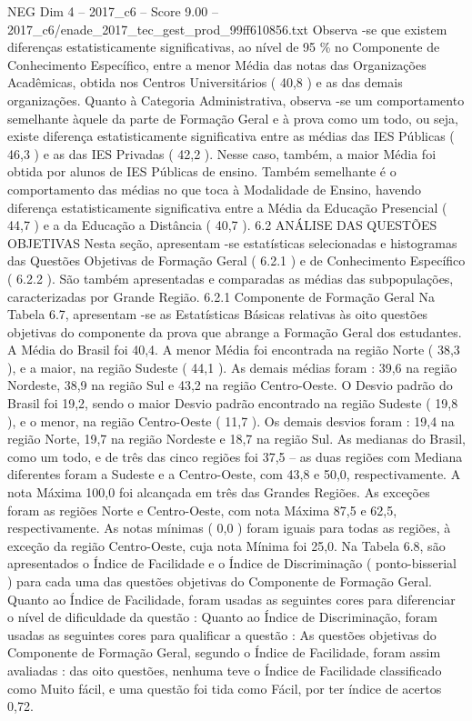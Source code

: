 \begin{textsample}{NEG Dim 4 – 2017\_c6 – Score 9.00 – 2017\_c6/enade\_2017\_tec\_gest\_prod\_99ff610856.txt}
Observa -se que existem diferenças estatisticamente significativas, ao nível de 95 \% no Componente de Conhecimento Específico, entre a menor Média das notas das Organizações Acadêmicas, obtida nos Centros Universitários ( 40,8 ) e as das demais organizações.
Quanto à Categoria Administrativa, observa -se um comportamento semelhante àquele da parte de Formação Geral e à prova como um todo, ou seja, existe diferença estatisticamente significativa entre as médias das IES Públicas ( 46,3 ) e as das IES Privadas ( 42,2 ).
Nesse caso, também, a maior Média foi obtida por alunos de IES Públicas de ensino.
Também semelhante é o comportamento das médias no que toca à Modalidade de Ensino, havendo diferença estatisticamente significativa entre a Média da Educação Presencial ( 44,7 ) e a da Educação a Distância ( 40,7 ). 6.2 ANÁLISE DAS QUESTÕES OBJETIVAS Nesta seção, apresentam -se estatísticas selecionadas e histogramas das Questões Objetivas de Formação Geral ( 6.2.1 ) e de Conhecimento Específico ( 6.2.2 ).
São também apresentadas e comparadas as médias das subpopulações, caracterizadas por Grande Região. 6.2.1 Componente de Formação Geral Na Tabela 6.7, apresentam -se as Estatísticas Básicas relativas às oito questões objetivas do componente da prova que abrange a Formação Geral dos estudantes.
A Média do Brasil foi 40,4.
A menor Média foi encontrada na região Norte ( 38,3 ), e a maior, na região Sudeste ( 44,1 ).
As demais médias foram : 39,6 na região Nordeste, 38,9 na região Sul e 43,2 na região Centro-Oeste.
O Desvio padrão do Brasil foi 19,2, sendo o maior Desvio padrão encontrado na região Sudeste ( 19,8 ), e o menor, na região Centro-Oeste ( 11,7 ).
Os demais desvios foram : 19,4 na região Norte, 19,7 na região Nordeste e 18,7 na região Sul.
As medianas do Brasil, como um todo, e de três das cinco regiões foi 37,5 – as duas regiões com Mediana diferentes foram a Sudeste e a Centro-Oeste, com 43,8 e 50,0, respectivamente.
A nota Máxima 100,0 foi alcançada em três das Grandes Regiões.
As exceções foram as regiões Norte e Centro-Oeste, com nota Máxima 87,5 e 62,5, respectivamente.
As notas mínimas ( 0,0 ) foram iguais para todas as regiões, à exceção da região Centro-Oeste, cuja nota Mínima foi 25,0.
Na Tabela 6.8, são apresentados o Índice de Facilidade e o Índice de Discriminação ( ponto-bisserial ) para cada uma das questões objetivas do Componente de Formação Geral.
Quanto ao Índice de Facilidade, foram usadas as seguintes cores para diferenciar o nível de dificuldade da questão : Quanto ao Índice de Discriminação, foram usadas as seguintes cores para qualificar a questão : As questões objetivas do Componente de Formação Geral, segundo o Índice de Facilidade, foram assim avaliadas : das oito questões, nenhuma teve o Índice de Facilidade classificado como Muito fácil, e uma questão foi tida como Fácil, por ter índice de acertos 0,72.

\end{textsample}
